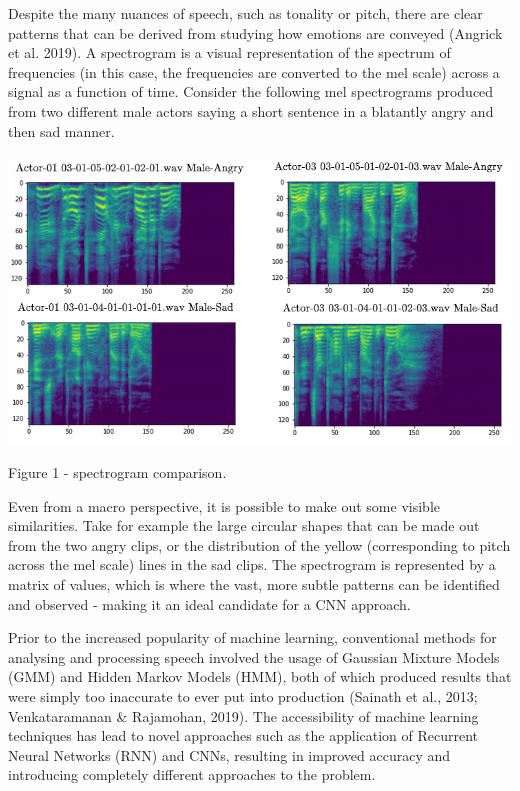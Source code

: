 \documentclass[12pt]{article}
\begin{document}
\noindent Despite the many nuances of speech, such as tonality or pitch, there are clear patterns that can be derived from studying how emotions are conveyed (Angrick et al. 2019). A spectrogram is a visual representation of the spectrum of frequencies (in this case, the frequencies are converted to the mel scale) across a signal as a function of time. Consider the following mel spectrograms produced from two different male actors saying a short sentence in a blatantly angry and then sad manner.
\\
\\
\includegraphics[width=14cm]{figure_1_spectrogram_comparison}

\noindent Figure 1 - spectrogram comparison.
\vspace{0.05cm}

\noindent Even from a macro perspective, it is possible to make out some visible similarities. Take for example the large circular shapes that can be made out from the two angry clips, or the distribution of the yellow (corresponding to pitch across the mel scale) lines in the sad clips. The spectrogram is represented by a matrix of values, which is where the vast, more subtle patterns can be identified and observed - making it an ideal candidate for a CNN approach.

\newpage

\noindent Prior to the increased popularity of machine learning, conventional methods for analysing and processing speech involved the usage of Gaussian Mixture Models (GMM) and Hidden Markov Models (HMM), both of which produced results that were simply too inaccurate to ever put into production (Sainath et al., 2013; Venkataramanan \& Rajamohan, 2019). The accessibility of machine learning techniques has lead to novel approaches such as the application of Recurrent Neural Networks (RNN) and CNNs, resulting in improved accuracy and introducing completely different approaches to the problem.
\\
\end{document}
